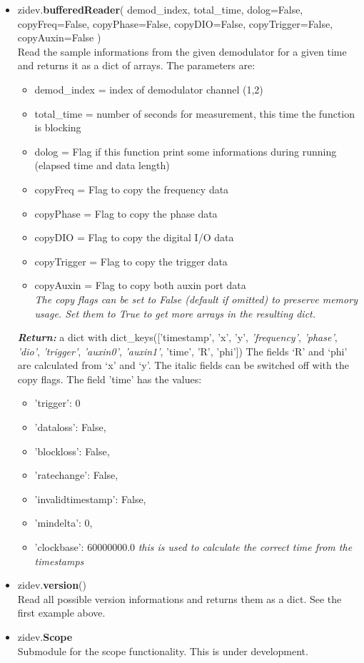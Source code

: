 \documentclass[11pt]{article} %
\begin{document}
\begin{itemize}
\item zidev.{\bf bufferedReader}( demod\_index, total\_time, dolog=False, copyFreq=False, copyPhase=False, copyDIO=False, copyTrigger=False, copyAuxin=False ) \\
	Read the sample informations from the given demodulator for a given time and returns it as a dict of arrays. The parameters are:
	\begin{itemize}
	\itemsep0pt
	\item demod\_index = index of demodulator channel (1,2)
	\item total\_time  = number of seconds for measurement, this time the function is blocking
	\item dolog = Flag if this function print some informations during running (elapsed time and data length)
	\item copyFreq = Flag to copy the frequency data
	\item copyPhase = Flag to copy the phase data
	\item copyDIO = Flag to copy the digital I/O data
	\item copyTrigger = Flag to copy the trigger data
	\item copyAuxin = Flag to copy both auxin port data \\
	{\it The copy flags can be set to False (default if omitted) to preserve memory usage. Set them to True to get more arrays in the resulting dict.}
	\end{itemize}
	\textbf{\textit{Return:}} a dict with dict\_keys(['timestamp', 'x', 'y', {\it 'frequency'}, {\it 'phase'}, {\it 'dio'}, {\it 'trigger'}, {\it 'auxin0'}, {\it 'auxin1'}, 'time', 'R', 'phi'])
	The fields `R' and `phi' are calculated from `x' and `y'. The italic fields can be switched off with the copy flags. The field 'time' has the values:
	\begin{itemize}[ ]
	\itemsep0pt
	\item 'trigger': 0
	\item 'dataloss': False,
	\item 'blockloss': False,
	\item 'ratechange': False,
	\item 'invalidtimestamp': False,
	\item 'mindelta': 0,
	\item 'clockbase': 60000000.0  {\it this is used to calculate the correct time from the timestamps}
  	\end{itemize}
  	
  \item zidev.{\bf version}() \\
  	Read all possible version informations and returns them as a dict. See the first example above.

  \item zidev.{\bf Scope} \\
  	Submodule for the scope functionality. This is under development.
  	
\end{itemize}
\end{document}
